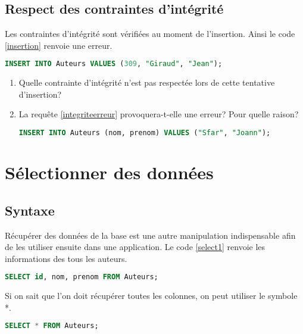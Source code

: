 \documentclass[a4paper,11pt]{article}
\begin{document}
\begin{Form}
\subsection{Respect des contraintes d'intégrité}
Les contraintes d'intégrité sont vérifiées au moment de l'insertion. Ainsi le code \ref{insertion} renvoie une erreur.
\begin{center}
\begin{lstlisting}[language=SQL]
INSERT INTO Auteurs VALUES (309, "Giraud", "Jean");
\end{lstlisting}
\label{insertion}
\end{center}
\begin{activite}
\begin{enumerate}
\item Quelle contrainte d'intégrité n'est pas respectée lors de cette tentative d'insertion?
\item La requête \ref{integriteerreur} provoquera-t-elle une erreur? Pour quelle raison?
\begin{center}
\begin{lstlisting}[language=SQL]
INSERT INTO Auteurs (nom, prenom) VALUES ("Sfar", "Joann");
\end{lstlisting}
\label{integriteerreur}
\end{center}
\end{enumerate}
\end{activite}
\section{Sélectionner des données}
\subsection{Syntaxe}
Récupérer des données de la base est une autre manipulation indispensable afin de les utiliser ensuite dans une application. Le code \ref{select1} renvoie les informations des tous les auteurs.
\begin{center}
\begin{lstlisting}[language=SQL]
SELECT id, nom, prenom FROM Auteurs;
\end{lstlisting}
\label{select1}
\end{center}
Si on sait que l'on doit récupérer toutes les colonnes, on peut utiliser le symbole *.
\begin{center}
\begin{lstlisting}[language=SQL]
SELECT * FROM Auteurs;
\end{lstlisting}
\label{select2}
\end{center}

\end{Form}
\end{document}
